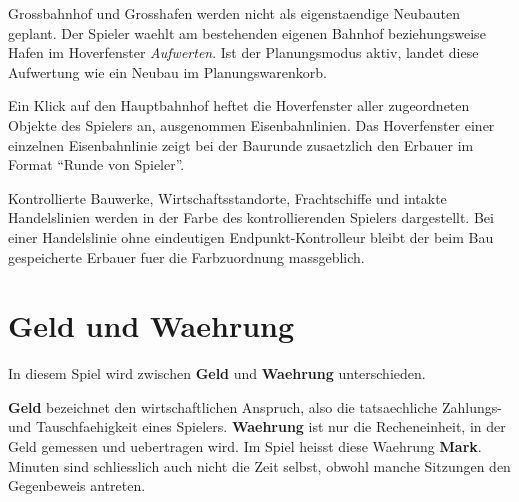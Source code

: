 \documentclass[11pt,a4paper,oneside,parskip=half]{scrreprt}
\newcommand{\begriff}[1]{\textbf{#1}}
\begin{document}
Grossbahnhof und Grosshafen werden nicht als eigenstaendige Neubauten geplant.
Der Spieler waehlt am bestehenden eigenen Bahnhof beziehungsweise Hafen im
Hoverfenster \emph{Aufwerten}. Ist der Planungsmodus aktiv, landet diese Aufwertung
wie ein Neubau im Planungswarenkorb.

Ein Klick auf den Hauptbahnhof heftet die Hoverfenster aller zugeordneten Objekte
des Spielers an, ausgenommen Eisenbahnlinien. Das Hoverfenster einer einzelnen
Eisenbahnlinie zeigt bei der Baurunde zusaetzlich den Erbauer im Format
\enquote{Runde von Spieler}.

Kontrollierte Bauwerke, Wirtschaftsstandorte, Frachtschiffe und intakte
Handelslinien werden in der Farbe des kontrollierenden Spielers dargestellt.
Bei einer Handelslinie ohne eindeutigen Endpunkt-Kontrolleur bleibt der beim Bau
gespeicherte Erbauer fuer die Farbzuordnung massgeblich.

\section{Geld und Waehrung}
In diesem Spiel wird zwischen \begriff{Geld} und \begriff{Waehrung} unterschieden.

\begriff{Geld} bezeichnet den wirtschaftlichen Anspruch, also die tatsaechliche Zahlungs- und Tauschfaehigkeit eines Spielers. \begriff{Waehrung} ist nur die Recheneinheit, in der Geld gemessen und uebertragen wird. Im Spiel heisst diese Waehrung \begriff{Mark}. Minuten sind schliesslich auch nicht die Zeit selbst, obwohl manche Sitzungen den Gegenbeweis antreten.
\end{document}
